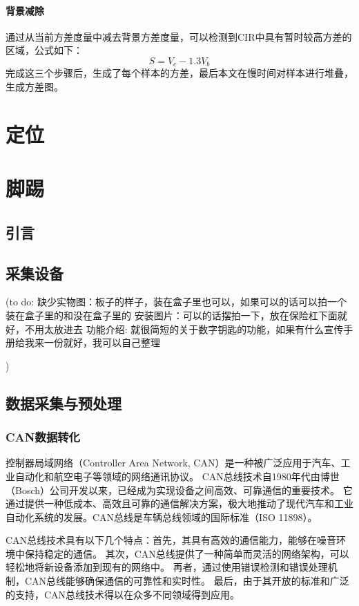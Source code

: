 \subsubsection{背景减除}
通过从当前方差度量中减去背景方差度量，可以检测到CIR中具有暂时较高方差的区域，公式如下：
\begin{equation}
    S = V_c - 1.3V_b
\end{equation}
完成这三个步骤后，生成了每个样本的方差，最后本文在慢时间对样本进行堆叠，生成方差图。


\chapter{定位}

\chapter{脚踢}

\section{引言}
\section{采集设备}
(to do: 
缺少实物图：板子的样子，装在盒子里也可以，如果可以的话可以拍一个装在盒子里的和没在盒子里的
安装图片：可以的话摆拍一下，放在保险杠下面就好，不用太放进去
功能介绍: 就很简短的关于数字钥匙的功能，如果有什么宣传手册给我来一份就好，我可以自己整理

)
\section{数据采集与预处理}
\subsection{CAN数据转化}
控制器局域网络（Controller Area Network, CAN）是一种被广泛应用于汽车、工业自动化和航空电子等领域的网络通讯协议。
CAN总线技术自1980年代由博世（Bosch）公司开发以来，已经成为实现设备之间高效、可靠通信的重要技术。
它通过提供一种低成本、高效且可靠的通信解决方案，极大地推动了现代汽车和工业自动化系统的发展。CAN总线是车辆总线领域的国际标准（ISO 11898）\cite{Chen2009ResearchOT}。

CAN总线技术具有以下几个特点：首先，其具有高效的通信能力，能够在噪音环境中保持稳定的通信。
其次，CAN总线提供了一种简单而灵活的网络架构，可以轻松地将新设备添加到现有的网络中。
再者，通过使用错误检测和错误处理机制，CAN总线能够确保通信的可靠性和实时性。
最后，由于其开放的标准和广泛的支持，CAN总线技术得以在众多不同领域得到应用。

